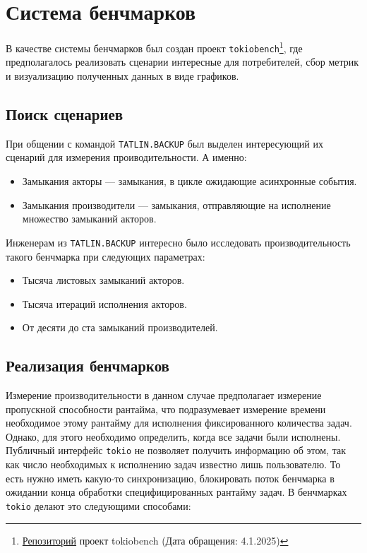 
\section{Система бенчмарков}

В качестве системы бенчмарков был создан проект \verb|tokiobench|\footnote{\href{https://github.com/IgorErin/tokiobench}{Репозиторий} проект tokiobench (Дата обращения: 4.1.2025)}, где предполагалось реализовать сценарии интересные для потребителей, сбор метрик и визуализацию полученных данных в виде графиков.

\subsection{Поиск сценариев}

При общении с командой \verb|TATLIN.BACKUP| был выделен интересующий их сценарий для измерения проиводительности. А именно:

\begin{itemize}
    \item Замыкания акторы --- замыкания, в цикле ожидающие асинхронные события.
    \item Замыкания производители --- замыкания, отправляющие на исполнение множество замыканий акторов.
\end{itemize}

Инженерам из \verb|TATLIN.BACKUP| интересно было исследовать производительность такого бенчмарка при следующих параметрах:

\begin{itemize}
    \item Тысяча листовых замыканий акторов.
    \item Тысяча итераций исполнения акторов.
    \item От десяти до ста замыканий производителей.
\end{itemize}

\subsection{Реализация бенчмарков}

Измерение производительности в данном случае предполагает измерение пропускной способности рантайма, что подразумевает измерение времени необходимое этому рантайму для исполнения фиксированного количества задач. Однако, для этого необходимо определить, когда все задачи были исполнены. Публичный интерфейс \verb|tokio| не позволяет получить информацию об этом, так как число необходимых к исполнению задач известно лишь пользователю. То есть нужно иметь какую-то синхронизацию, блокировать поток бенчмарка в ожидании конца обработки специфицированных рантайму задач. В бенчмарках \verb|tokio| делают это следующими способами:

